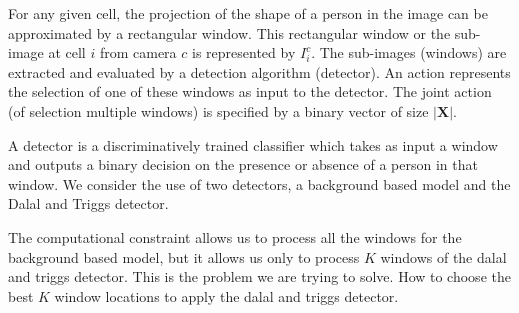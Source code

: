 \documentclass[10pt,twocolumn,letterpaper]{article}
\begin{document}
For any given cell, the projection of the shape of a person in the image can be approximated by a rectangular window. This rectangular window or the sub-image at cell $ i $ from camera $ c$ is represented by $ I^{c}_{i} $. The sub-images (windows) are extracted and evaluated by a detection algorithm (detector). An action represents the selection of one of these windows as input to the detector. The joint action (of selection multiple windows) is specified by a binary  vector of size $|\textbf{X}| $.

A detector is a discriminatively trained classifier which takes as input a window and outputs a binary decision on the presence or absence of a person in that window. We consider the use of two detectors, a background based model and the Dalal and Triggs detector.

The computational constraint allows us to process all the windows for the background based model, but it allows us only to process $ K $ windows of the dalal and triggs detector. This is the problem we are trying to solve. How to choose the best $K$ window locations to apply the dalal and triggs detector.



\end{document}
